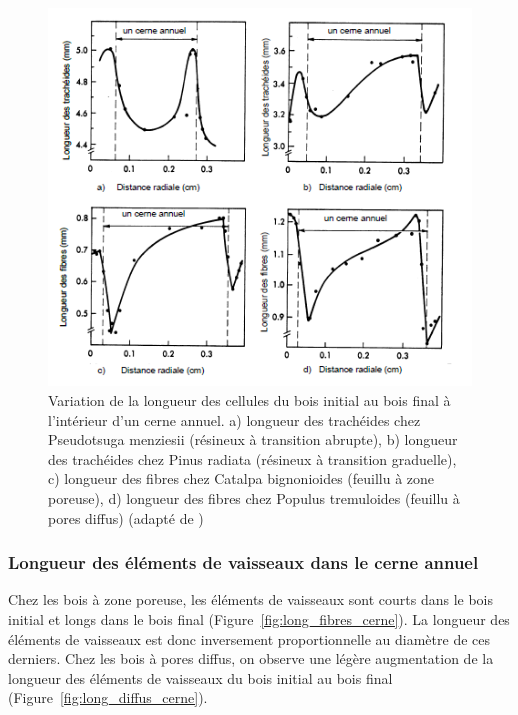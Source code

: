 \begin{figure}[h]
	\centering
	\includegraphics[scale=0.8]{img/ch7_long_cerne}
	\caption{Variation de la longueur des cellules du bois initial au bois final à l'intérieur d'un cerne annuel. a) longueur des trachéides chez Pseudotsuga menziesii (résineux à transition abrupte), b) longueur des trachéides chez Pinus radiata (résineux à transition graduelle), c) longueur des fibres chez Catalpa bignonioides (feuillu à zone poreuse), d) longueur des fibres chez Populus tremuloides (feuillu à pores diffus) (adapté de \cite{panshin1980textbook})}
	\label{fig:long_cerne}
\end{figure}

\subsubsection{Longueur des éléments de vaisseaux dans le cerne annuel}

Chez les bois à zone poreuse, les éléments de vaisseaux sont courts dans le bois initial et longs dans le bois final (Figure~\ref{fig:long_fibres_cerne}). La longueur des éléments de vaisseaux est donc inversement proportionnelle au diamètre de ces derniers. Chez les bois à pores diffus, on observe une légère augmentation de la longueur des éléments de vaisseaux du bois initial au bois final (Figure~\ref{fig:long_diffus_cerne}).


